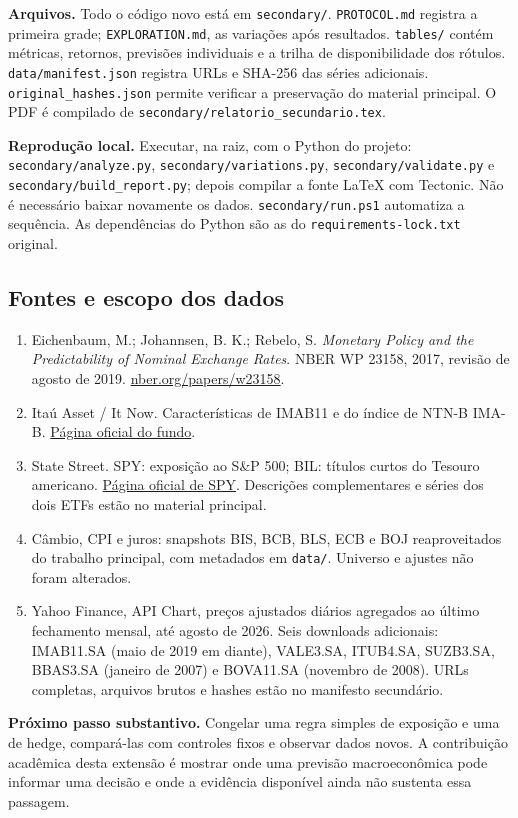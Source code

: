 \documentclass[11pt,a4paper]{article}
\begin{document}
\textbf{Arquivos.} Todo o código novo está em \texttt{secondary/}. \texttt{PROTOCOL.md} registra a primeira grade; \texttt{EXPLORATION.md}, as variações após resultados. \texttt{tables/} contém métricas, retornos, previsões individuais e a trilha de disponibilidade dos rótulos. \texttt{data/manifest.json} registra URLs e SHA-256 das séries adicionais. \texttt{original\_hashes.json} permite verificar a preservação do material principal. O PDF é compilado de \texttt{secondary/relatorio\_secundario.tex}.

\textbf{Reprodução local.} Executar, na raiz, com o Python do projeto: \texttt{secondary/analyze.py}, \texttt{secondary/variations.py}, \texttt{secondary/validate.py} e \texttt{secondary/build\_report.py}; depois compilar a fonte LaTeX com Tectonic. Não é necessário baixar novamente os dados. \texttt{secondary/run.ps1} automatiza a sequência. As dependências do Python são as do \texttt{requirements-lock.txt} original.

\subsection*{Fontes e escopo dos dados}
\begin{enumerate}[leftmargin=1.7em,itemsep=5pt]
\item Eichenbaum, M.; Johannsen, B. K.; Rebelo, S. \emph{Monetary Policy and the Predictability of Nominal Exchange Rates}. NBER WP 23158, 2017, revisão de agosto de 2019. \href{https://www.nber.org/papers/w23158}{nber.org/papers/w23158}.
\item Itaú Asset / It Now. Características de IMAB11 e do índice de NTN-B IMA-B. \href{https://www.itnow.com.br/imab11/caracteristicas/}{Página oficial do fundo}.
\item State Street. SPY: exposição ao S\&P 500; BIL: títulos curtos do Tesouro americano. \href{https://www.ssga.com/us/en/individual/etfs/state-street-spdr-sp-500-etf-trust-spy}{Página oficial de SPY}. Descrições complementares e séries dos dois ETFs estão no material principal.
\item Câmbio, CPI e juros: snapshots BIS, BCB, BLS, ECB e BOJ reaproveitados do trabalho principal, com metadados em \texttt{data/}. Universo e ajustes não foram alterados.
\item Yahoo Finance, API Chart, preços ajustados diários agregados ao último fechamento mensal, até agosto de 2026. Seis downloads adicionais: IMAB11.SA (maio de 2019 em diante), VALE3.SA, ITUB4.SA, SUZB3.SA, BBAS3.SA (janeiro de 2007) e BOVA11.SA (novembro de 2008). URLs completas, arquivos brutos e hashes estão no manifesto secundário.
\end{enumerate}

\textbf{Próximo passo substantivo.} Congelar uma regra simples de exposição e uma de hedge, compará-las com controles fixos e observar dados novos. A contribuição acadêmica desta extensão é mostrar onde uma previsão macroeconômica pode informar uma decisão e onde a evidência disponível ainda não sustenta essa passagem.
\end{document}
